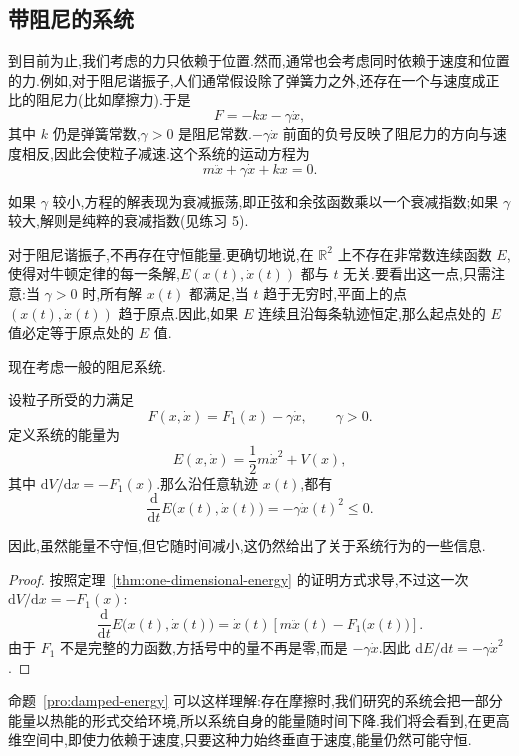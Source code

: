 \subsection{带阻尼的系统}

到目前为止,我们考虑的力只依赖于位置.然而,通常也会考虑同时依赖于速度和位置的力.例如,对于阻尼谐振子,人们通常假设除了弹簧力之外,还存在一个与速度成正比的阻尼力(比如摩擦力).于是
\[
  F=-kx-\gamma\dot{x},
\]
其中 $k$ 仍是弹簧常数,$\gamma>0$ 是阻尼常数.$-\gamma\dot{x}$ 前面的负号反映了阻尼力的方向与速度相反,因此会使粒子减速.这个系统的运动方程为
\[
  m\ddot{x}+\gamma\dot{x}+kx=0.
\]

如果 $\gamma$ 较小,方程的解表现为衰减振荡,即正弦和余弦函数乘以一个衰减指数;如果 $\gamma$ 较大,解则是纯粹的衰减指数(见练习 5).

对于阻尼谐振子,不再存在守恒能量.更确切地说,在 $\mathbb{R}^{2}$ 上不存在非常数连续函数 $E$,使得对牛顿定律的每一条解,$E(x(t),\dot{x}(t))$ 都与 $t$ 无关.要看出这一点,只需注意:当 $\gamma>0$ 时,所有解 $x(t)$ 都满足,当 $t$ 趋于无穷时,平面上的点 $(x(t),\dot{x}(t))$ 趋于原点.因此,如果 $E$ 连续且沿每条轨迹恒定,那么起点处的 $E$ 值必定等于原点处的 $E$ 值.

现在考虑一般的阻尼系统.

\begin{proposition}[阻尼系统中的能量]\label{pro:damped-energy}
设粒子所受的力满足
\[
  F(x,\dot{x})=F_{1}(x)-\gamma\dot{x},\qquad \gamma>0.
\]
定义系统的能量为
\[
  E(x,\dot{x})=\frac12m\dot{x}^{2}+V(x),
\]
其中 $\mathrm{d}V/\mathrm{d}x=-F_{1}(x)$.那么沿任意轨迹 $x(t)$,都有
\begin{equation}
  \frac{\mathrm{d}}{\mathrm{d}t}E\bigl(x(t),\dot{x}(t)\bigr)=-\gamma\dot{x}(t)^{2}\leq 0.
  \label{eq:damped-energy-decay}
\end{equation}
\end{proposition}

因此,虽然能量不守恒,但它随时间减小,这仍然给出了关于系统行为的一些信息.

\begin{proof}
按照定理~\ref{thm:one-dimensional-energy} 的证明方式求导,不过这一次 $\mathrm{d}V/\mathrm{d}x=-F_{1}(x)$:
\[
  \frac{\mathrm{d}}{\mathrm{d}t}E\bigl(x(t),\dot{x}(t)\bigr)
  =\dot{x}(t)\left[m\ddot{x}(t)-F_{1}\bigl(x(t)\bigr)\right].
\]
由于 $F_{1}$ 不是完整的力函数,方括号中的量不再是零,而是 $-\gamma\dot{x}$.因此 $\mathrm{d}E/\mathrm{d}t=-\gamma\dot{x}^{2}$.
\end{proof}

命题~\ref{pro:damped-energy} 可以这样理解:存在摩擦时,我们研究的系统会把一部分能量以热能的形式交给环境,所以系统自身的能量随时间下降.我们将会看到,在更高维空间中,即使力依赖于速度,只要这种力始终垂直于速度,能量仍然可能守恒.

